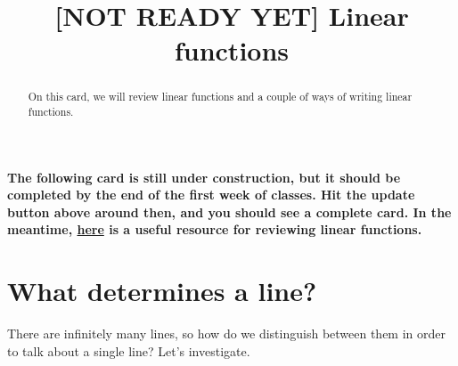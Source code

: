 \documentclass{ximera}
\title[Dig-In:]{[NOT READY YET] Linear functions}
\begin{document}
\begin{abstract}
On this card, we will review linear functions and a couple of ways of writing linear functions. 
\end{abstract}
\maketitle

\textbf{The following card is still under construction, but it should be completed by the end of the first week of classes.  Hit the update button above around then, and you should see a complete card.  In the meantime, \href{http://tutorial.math.lamar.edu/Classes/Alg/Lines.aspx}{here} is a useful resource for reviewing linear functions.}

\section{What determines a line?}

There are infinitely many lines, so how do we distinguish between them in order to talk about a single line?  Let's investigate. 
\end{document}
